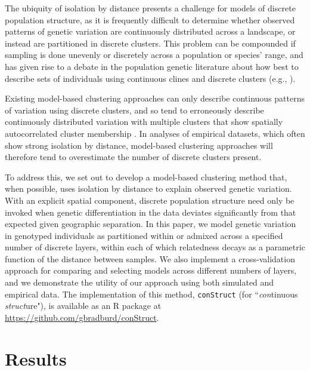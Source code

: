 \documentclass[10pt,letterpaper]{article}
\begin{document}
The ubiquity of isolation by distance presents a challenge for models of discrete population structure,
as it is frequently difficult to determine whether observed patterns of genetic variation are 
continuously distributed across a landscape, or instead are partitioned in discrete clusters.
This problem can be compounded if sampling is done unevenly or discretely across a population or species' range,
and has given rise to a debate in the population genetic literature
about how best to describe sets of individuals using continuous clines and discrete clusters 
(e.g., \cite{SerrePaabo2004,rosenberg2005clines}).

Existing model-based clustering approaches can only describe continuous patterns of variation using
discrete clusters, and so tend to erroneously describe continuously distributed variation with multiple clusters that 
show spatially autocorrelated cluster membership \cite{Frantz2009,meirmans2012}.
In analyses of empirical datasets, which often show strong isolation by distance,
model-based clustering approaches will therefore tend to overestimate
the number of discrete clusters present. 

To address this, we set out to develop
a model-based clustering method that, when possible, uses isolation by distance 
to explain observed genetic variation.
With an explicit spatial component, discrete population structure need only be invoked when genetic differentiation 
in the data deviates significantly from that expected given geographic separation.
In this paper, 
we model genetic variation in genotyped individuals as 
partitioned within or admixed across a specified number of discrete layers,
within each of which relatedness decays as a parametric function of the distance between samples.
We also implement a cross-validation approach for comparing and selecting models across different numbers of layers,
and we demonstrate the utility of our approach using both simulated and empirical data.
The implementation of this method, \texttt{conStruct} (for ``\emph{con}tinuous \emph{struct}ure"), 
is available as an R package at 
\href{https://github.com/gbradburd/conStruct}{https://github.com/gbradburd/conStruct}.


\section*{Results}
\end{document}
